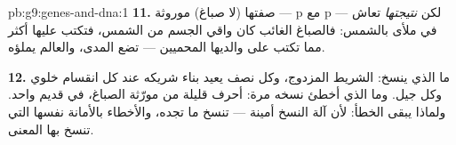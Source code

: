 \begin{solution}{pb:g9:genes-and-dna:1}
\textbf{11.} صفتها (لا صباغ) موروثة --- p مع p --- لكن
\emph{نتيجتها} تعاش في  ملأى بالشمس: فالصباغ الغائب
كان واقي الجسم من الشمس، فتكتب  عليها أكثر مما
تكتب على والديها المحميين ---  تضع المدى،
والعالم يملؤه.

\textbf{12.} ما الذي ينسخ: الشريط المزدوج، وكل نصف يعيد
بناء شريكه عند كل انقسام خلوي وكل جيل. وما الذي أخطئ
نسخه مرة: أحرف قليلة من مورّثة الصباغ، في  قديم
واحد. ولماذا يبقى الخطأ: لأن آلة النسخ أمينة --- تنسخ
ما تجده، والأخطاء بالأمانة نفسها التي تنسخ بها المعنى.
\end{solution}
